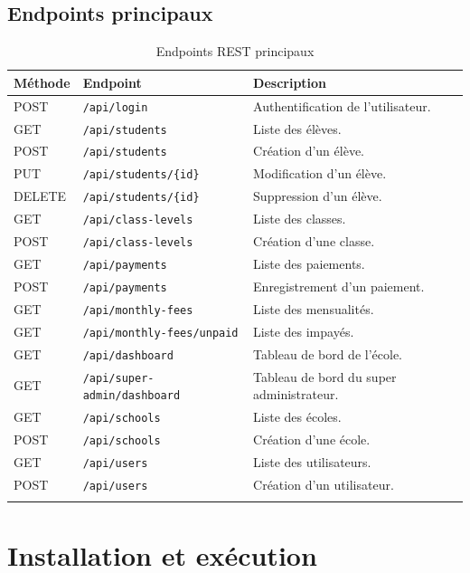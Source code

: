 \documentclass[12pt,a4paper]{report}
\begin{document}
\section{Endpoints principaux}

\begin{longtable}{|p{2.5cm}|p{5cm}|p{7cm}|}
\hline
\textbf{Méthode} & \textbf{Endpoint} & \textbf{Description} \\
\hline
POST & \texttt{/api/login} & Authentification de l'utilisateur. \\
\hline
GET & \texttt{/api/students} & Liste des élèves. \\
\hline
POST & \texttt{/api/students} & Création d'un élève. \\
\hline
PUT & \texttt{/api/students/\{id\}} & Modification d'un élève. \\
\hline
DELETE & \texttt{/api/students/\{id\}} & Suppression d'un élève. \\
\hline
GET & \texttt{/api/class-levels} & Liste des classes. \\
\hline
POST & \texttt{/api/class-levels} & Création d'une classe. \\
\hline
GET & \texttt{/api/payments} & Liste des paiements. \\
\hline
POST & \texttt{/api/payments} & Enregistrement d'un paiement. \\
\hline
GET & \texttt{/api/monthly-fees} & Liste des mensualités. \\
\hline
GET & \texttt{/api/monthly-fees/unpaid} & Liste des impayés. \\
\hline
GET & \texttt{/api/dashboard} & Tableau de bord de l'école. \\
\hline
GET & \texttt{/api/super-admin/dashboard} & Tableau de bord du super administrateur. \\
\hline
GET & \texttt{/api/schools} & Liste des écoles. \\
\hline
POST & \texttt{/api/schools} & Création d'une école. \\
\hline
GET & \texttt{/api/users} & Liste des utilisateurs. \\
\hline
POST & \texttt{/api/users} & Création d'un utilisateur. \\
\hline
\caption{Endpoints REST principaux}
\end{longtable}

\chapter{Installation et exécution}
\end{document}
